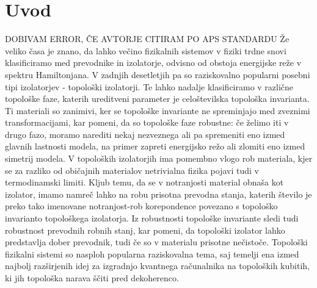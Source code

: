 
\cleardoublepage
\tableofcontents


\pagestyle{fancy}
\fancyhead[CE,RE]{}
\fancyhead[LO,CO]{}
\fancyhead[LE]{\textbf{\nouppercase{\leftmark}}}
\fancyhead[RO]{\textbf{\nouppercase{\rightmark}}}

%

\chapter{Uvod}
\label{chUv}
DOBIVAM ERROR, ČE AVTORJE CITIRAM PO APS STANDARDU
Že veliko časa je znano, da lahko večino fizikalnih sistemov v fiziki trdne snovi klasificiramo med prevodnike in izolatorje, odvisno od obstoja energijske reže v spektru Hamiltonjana. V zadnjih desetletjih pa so raziskovalno popularni posebni tipi izolatorjev - topološki izolatorji. Te lahko nadalje klasificiramo v različne topološke faze, katerih ureditveni parameter je celoštevilska topološka invarianta. Ti materiali so zanimivi, ker se topološke invariante ne spreminjajo med zveznimi transformacijami, kar pomeni, da so topološke faze robustne: če želimo iti v drugo fazo, moramo narediti nekaj nezveznega ali pa spremeniti eno izmed glavnih lastnosti modela, na primer zapreti energijsko režo ali zlomiti eno izmed simetrij modela. V topoloških izolatorjih ima pomembno vlogo rob materiala, kjer se za razliko od običajnih materialov netrivialna fizika pojavi tudi v termodinamski limiti. Kljub temu, da se v notranjosti material obnaša kot izolator, imamo namreč lahko na robu prisotna prevodna stanja, katerih število je preko tako imenovane notranjost-rob korepondence povezano s topološko invarianto topološkega izolatorja. Iz robustnosti topološke invariante sledi tudi robustnost prevodnih robnih stanj, kar pomeni, da topološki izolator lahko predstavlja dober prevodnik, tudi če so v materialu prisotne nečistoče. Topološki fizikalni sistemi so nasploh popularna raziskovalna tema, saj temelji ena izmed najbolj razširjenih idej za izgradnjo kvantnega računalnika na topoloških kubitih, ki jih topološka narava ščiti pred dekoherenco.

